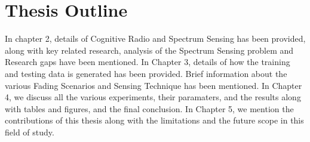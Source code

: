 \section{Thesis Outline}
In chapter 2, details of Cognitive Radio and Spectrum Sensing has been provided, along with key related research, analysis of the Spectrum Sensing problem and Research gaps have been mentioned.
In Chapter 3, details of how the training and testing data is generated has been provided. Brief information about the various Fading Scenarios and Sensing Technique has been mentioned.
In Chapter 4, we discuss all the various experiments, their paramaters, and the results along with tables and figures, and the final conclusion.
In Chapter 5, we mention the contributions of this thesis along with the limitations and the future scope in this field of study.



